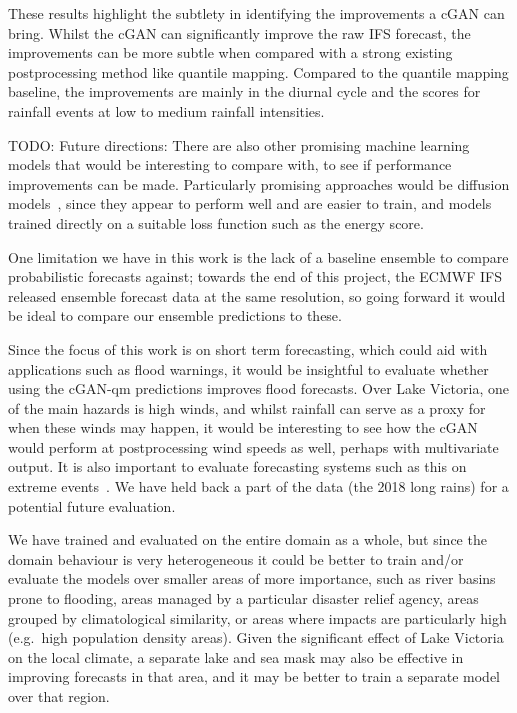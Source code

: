 \documentclass{article}
\begin{document}
These results highlight the subtlety in identifying the improvements a cGAN can bring. Whilst the cGAN can significantly improve the raw IFS forecast, the improvements can be more subtle when compared with a strong existing postprocessing method like quantile mapping. Compared to the quantile mapping baseline, the improvements are mainly in the diurnal cycle and the scores for rainfall events at low to medium rainfall intensities. 

TODO: Future directions:
There are also other promising machine learning models that would be interesting to compare with, to see if performance improvements can be made. Particularly promising approaches would be diffusion models~\citep{addison_machine_2022, leinonen_latent_2023}, since they appear to perform well and are easier to train, and models trained directly on a suitable loss function such as the energy score.



One limitation we have in this work is the lack of a baseline ensemble to compare probabilistic forecasts against; towards the end of this project, the ECMWF IFS released ensemble forecast data at the same resolution, so going forward it would be ideal to compare our ensemble predictions to these. 
 
Since the focus of this work is on short term forecasting, which could aid with applications such as flood warnings, it would be insightful to evaluate whether using the cGAN-qm predictions improves flood forecasts. Over Lake Victoria, one of the main hazards is high winds, and whilst rainfall can serve as a proxy for when these winds may happen, it would be interesting to see how the cGAN would perform at postprocessing wind speeds as well, perhaps with multivariate output. It is also important to evaluate forecasting systems such as this on extreme events~\citep{watson_machine_2022}. We have held back a part of the data (the 2018 long rains) for a potential future evaluation.

We have trained and evaluated on the entire domain as a whole, but since the domain behaviour is very heterogeneous it could be better to train and/or evaluate the models over smaller areas of more importance, such as river basins prone to flooding, areas managed by a particular disaster relief agency, areas grouped by climatological similarity, or areas where impacts are particularly high (e.g.~high population density areas). Given the significant effect of Lake Victoria on the local climate, a separate lake and sea mask may also be effective in improving forecasts in that area, and it may be better to train a separate model over that region.
\end{document}
